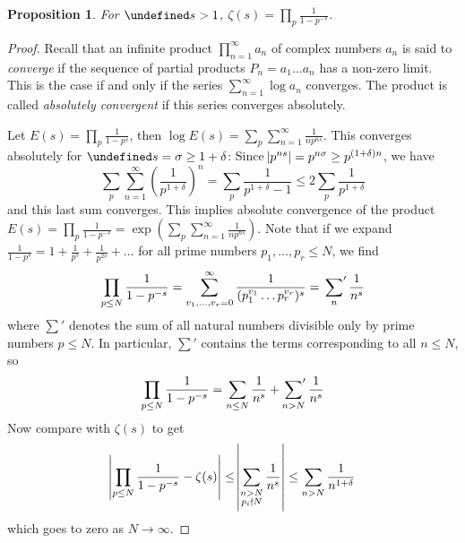 \documentclass[11pt]{article}
\theoremstyle{definition}
\theoremstyle{plain}
\newtheorem{proposition}[definition]{Proposition}
\theoremstyle{remark}
\let\Re\undefined
\DeclareMathOperator{\Re}{Re}
\begin{document}
\begin{proposition}\label{prop:5_7}
    For $\Re s > 1$, $\zeta(s) = \prod_p \frac{1}{1-p^{-s}}$.
\end{proposition}
\begin{proof}
    Recall that an infinite product $\prod_{n=1}^\infty a_n$ of complex numbers $a_n$ is said to \emph{converge} if the sequence of partial products $P_n = a_1 \ldots a_n$ has a non-zero limit. This is the case if and only if the series $\sum_{n=1}^\infty \log a_n$ converges. The product is called \emph{absolutely convergent} if this series converges absolutely.

    Let $E(s) = \prod_p \frac{1}{1-p^s}$, then $\log E(s) = \sum_p \sum_{n=1}^\infty \frac{1}{n p^{ns}}$. This converges absolutely for $\Re s = \sigma \ge 1 + \delta$: Since $\abs{p^{ns}} = p^{n \sigma} \ge p^{(1+\delta) n}$, we have
    \begin{equation*}
        \sum_p \sum_{n=1}^\infty \left(\frac{1}{p^{1+\delta}}\right)^n = \sum_p \frac{1}{p^{1+\delta}-1} \le 2 \sum_p \frac{1}{p^{1+\delta}}
    \end{equation*}
    and this last sum converges. This implies absolute convergence of the product $E(s) = \prod_p \frac{1}{1-p^{-s}} = \exp\left(\sum_p \sum_{n=1}^\infty \frac{1}{n p^{ns}}\right)$. Note that if we expand $\frac{1}{1-p^s} = 1+\frac{1}{p^s}+\frac{1}{p^{2s}}+\ldots$ for all prime numbers $p_1, \ldots, p_r \le N$, we find
    \begin{equation*}
        \prod_{p \le N} \frac{1}{1-p^{-s}} = \sum_{v_1, \ldots, v_r = 0}^{\infty} \frac{1}{(p_1^{v_1} \ldots p_r^{v_r})^s} = \sideset{}{'}\sum_n \frac{1}{n^s}
    \end{equation*}
    where $\sum'$ denotes the sum of all natural numbers divisible only by prime numbers $p \le N$. In particular, $\sum'$ contains the terms corresponding to all $n \le N$, so
    \begin{equation*}
        \prod_{p \le N} \frac{1}{1-p^{-s}} = \sum_{n \le N} \frac{1}{n^s} + \sideset{}{'}\sum_{n > N} \frac{1}{n^s}
    \end{equation*}
    Now compare with $\zeta(s)$ to get
    \begin{equation*}
        \abs{\prod_{p \le N} \frac{1}{1-p^{-s}} - \zeta(s)} \le \abs{\sum_{\substack{n > N \\ p_i \nmid N}} \frac{1}{n^s}} \le \sum_{n > N} \frac{1}{n^{1+\delta}}
    \end{equation*}
    which goes to zero as $N \to \infty$.
\end{proof}
\end{document}
